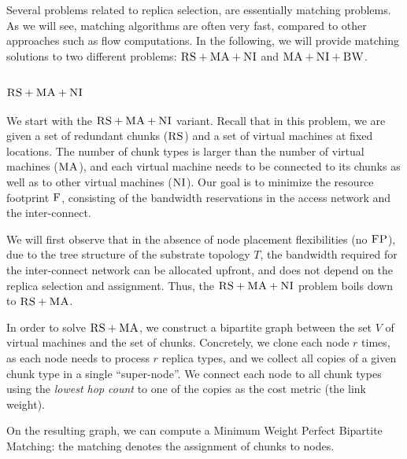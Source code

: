 \documentclass[9pt,twocolumn]{scrartcl}
\newcommand{\MaFactor}{r}
\newcommand{\ChunkType}{\tau}
\newcommand{\VirtualNodes}{\ensuremath{V}}
\newcommand{\CC}{\textsc{NI}}
\newcommand{\FP}{\textsc{FP}}
\newcommand{\RS}{\textsc{RS}}
\newcommand{\BW}{\textsc{BW}}
\newcommand{\MA}{\textsc{MA}}
\newcommand{\Cost}{\textsc{F}}
\newcommand{\Tree}{\ensuremath{T}}
\begin{document}
Several problems related to replica selection,
are essentially matching problems. As we will see,
matching algorithms are often very fast, compared
to other approaches such as flow computations.
In the following, we will provide matching solutions to
two different problems: $\RS+\MA+\CC$ and $\MA+\CC+\BW$.

\subsubsection{$\RS+\MA+\CC$}

We start with the $\RS+\MA+\CC$ variant.
Recall that in this problem,
we are given a set of redundant chunks ($\RS$) and a set of virtual machines
at fixed locations. The number of chunk types is larger than the number
of virtual machines ($\MA$), and each virtual machine needs to be connected
to its chunks as well as to other virtual machines ($\CC$).
Our goal is to minimize the resource footprint $\Cost$, consisting
of the bandwidth reservations in the access network and the inter-connect.

We will first observe that in the absence of node placement flexibilities (no $\FP$),
due to the tree structure of the substrate topology $\Tree$, the bandwidth required
for the inter-connect network can be allocated upfront, and does not depend on the replica
selection and assignment. Thus, the $\RS+\MA+\CC$ problem boils down to $\RS+\MA$.

In order to solve $\RS+\MA$, we construct a bipartite graph between the set
$\VirtualNodes$ of virtual machines and
the set of chunks.
Concretely, we clone each node $\MaFactor$ times,
as each node needs to process
$\MaFactor$ replica types, and we collect all copies of a given chunk type in a
single %
``super-node''. We connect each node to all chunk types using the
\emph{lowest hop count} to one of the copies as the cost metric (the link weight).

On the resulting graph, we can compute a Minimum Weight
Perfect Bipartite
Matching:
the matching denotes the assignment of chunks to nodes.
\end{document}
